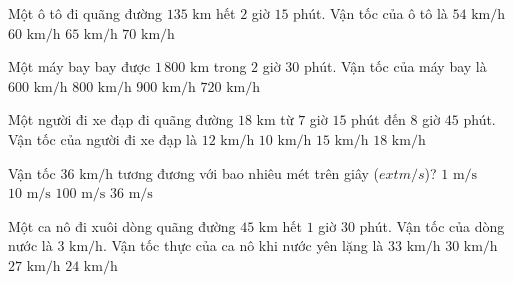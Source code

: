 \begin{ex} %
Một ô tô đi quãng đường $135\text{ km}$ hết $2$ giờ $15$ phút. Vận tốc của ô tô là
\choice
{$54\text{ km/h}$}
{\True $60\text{ km/h}$}
{$65\text{ km/h}$}
{$70\text{ km/h}$}
\end{ex}

\begin{ex} %
Một máy bay bay được $1\,800\text{ km}$ trong $2$ giờ $30$ phút. Vận tốc của máy bay là
\choice
{$600\text{ km/h}$}
{$800\text{ km/h}$}
{$900\text{ km/h}$}
{\True $720\text{ km/h}$}
\end{ex}

\begin{ex} %
Một người đi xe đạp đi quãng đường $18\text{ km}$ từ $7$ giờ $15$ phút đến $8$ giờ $45$ phút. Vận tốc của người đi xe đạp là
\choice
{\True $12\text{ km/h}$}
{$10\text{ km/h}$}
{$15\text{ km/h}$}
{$18\text{ km/h}$}
\end{ex}

\begin{ex} %
Vận tốc $36\text{ km/h}$ tương đương với bao nhiêu mét trên giây ($	ext{m/s}$)?
\choice
{$1\text{ m/s}$}
{\True $10\text{ m/s}$}
{$100\text{ m/s}$}
{$36\text{ m/s}$}
\end{ex}

\begin{ex} %
Một ca nô đi xuôi dòng quãng đường $45\text{ km}$ hết $1$ giờ $30$ phút. Vận tốc của dòng nước là $3\text{ km/h}$. Vận tốc thực của ca nô khi nước yên lặng là
\choice
{$33\text{ km/h}$}
{$30\text{ km/h}$}
{\True $27\text{ km/h}$}
{$24\text{ km/h}$}
\end{ex}

